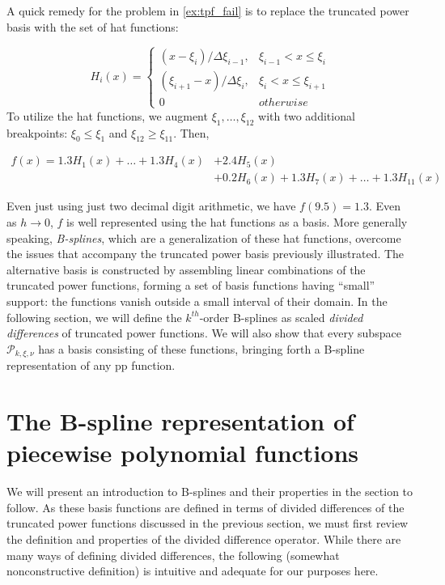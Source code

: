 \documentclass[12pt]{article}
\newcommand{\PP}{\mathcal{P}}
\theoremstyle{definition}
\begin{document}
A quick remedy for the problem in \ref{ex:tpf_fail} is to replace the truncated power basis with the set of hat functions:

\[
H_i\left(x\right)=\left\{
\begin{array}{lr}
\left(x-\xi_i\right)/\Delta\xi_{i-1}, & \xi_{i-1} < x \le \xi_i\\
\left(\xi_{i+1}-x\right)/\Delta\xi_{i}, & \xi_{i} < x \le \xi_{i+1}\\
0 & otherwise
\end{array}  \right.
\]
\noindent
To utilize the hat functions, we augment $\xi_1,\dots,\xi_12$ with two additional breakpoints: $\xi_0 \le \xi_1$ and $\xi_{12} \ge \xi_{11}$. Then,

\begin{align*}
f\left(x\right) = 1.3H_1\left(x\right) + \dots + 1.3H_4\left(x\right) &+ 2.4H_5\left(x\right) \\
 &+   0.2H_6\left(x\right)+ 1.3H_7\left(x\right) + \dots + 1.3H_{11}\left(x\right)
\end{align*}

Even just using just two decimal digit arithmetic, we have $f\left(9.5\right) = 1.3$. Even as $h \rightarrow 0$, $f$ is well represented using the hat functions as a basis. More generally speaking, \emph{B-splines}, which are a generalization of these hat functions, overcome the issues that accompany the truncated power basis previously illustrated. The alternative basis is constructed by assembling linear combinations of the truncated power functions, forming a set of basis functions having ``small'' support: the functions vanish outside a small interval of their domain. In the following section, we will define the $k^{th}$-order B-splines as scaled \emph{divided differences} of truncated power functions. We will also show that every subspace $\PP_{k,\xi,\nu}$ has a basis consisting of these functions, bringing forth a B-spline representation of any pp function. 

\section{The B-spline representation of piecewise polynomial functions}

We will present an introduction to B-splines and their properties in the section to follow. As these basis functions are defined in terms of divided differences of the truncated power functions discussed in the previous section, we must first review the definition and properties of the divided difference operator. While there are many ways of defining divided differences, the following (somewhat nonconstructive definition) is intuitive and adequate for our purposes here.
\end{document}
